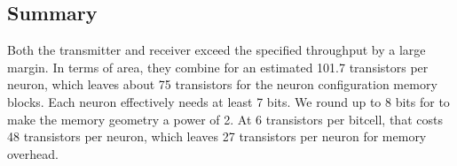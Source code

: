 \documentclass{article}
\begin{document}
\subsection{Summary}

Both the transmitter and receiver exceed the specified throughput by a large 
margin.
In terms of area, they combine for an estimated 101.7 transistors per neuron, 
which leaves about 75 transistors for the neuron configuration memory blocks.
Each neuron effectively needs at least 7 bits. We round up to 8 bits
for to make the memory geometry a power of 2. At 6 transistors per bitcell, that 
costs 48 transistors per neuron, which leaves 27 transistors per neuron
for memory overhead.

\end{document}
